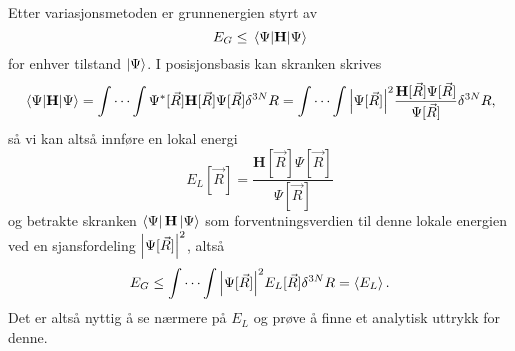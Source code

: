 \documentclass[pdftex,10pt,b5paper,twoside]{book}
\begin{document}
Etter variasjonsmetoden er grunnenergien styrt av
\begin{equation}
E_G \leq \ev{\mathbf{H}}{\Psi}
\end{equation}
for enhver tilstand $\ket{\Psi}$. I posisjonsbasis kan skranken skrives
\begin{equation}
\ev{\mathbf{H}}{\Psi} = \idotsint \Psi^*[\vec{R}]\mathbf{H}[\vec{R}]\Psi[\vec{R}]\delta^{3N}R = \idotsint \abs{\Psi[\vec{R}]}^2\frac{\mathbf{H}[\vec{R}]\Psi[\vec{R}]}{\Psi[\vec{R}]} \delta^{3N}R, \nonumber
\end{equation}
så vi kan altså innføre en lokal energi
\begin{equation}
E_L[\vec{R}] = \frac{\mathbf{H}[\vec{R}]\Psi[\vec{R}]}{\Psi[\vec{R}]}
\end{equation}
og betrakte skranken $\bra{\Psi}\mathbf{H}\ket{\Psi}$ som forventningsverdien til denne lokale energien ved en sjansfordeling $\abs{\Psi[\vec{R}]}^2$, altså
\begin{equation}
E_G \leq \idotsint \abs{\Psi[\vec{R}]}^2E_L[\vec{R}] \delta^{3N}R = \ev{E_L}.
\end{equation}
Det er altså nyttig å se nærmere på $E_L$ og prøve å finne et analytisk uttrykk for denne.
\end{document}

